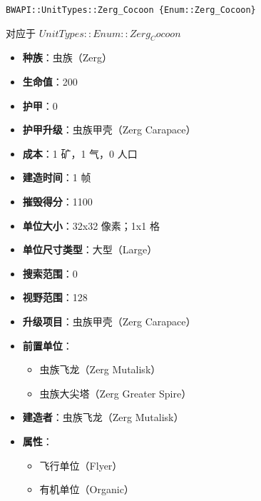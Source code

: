 \begin{tcolorbox}[colback=white, colframe=black!60!white, title=Zerg\_Cocoon(), arc=0mm]
    \begin{verbatim}
BWAPI::UnitTypes::Zerg_Cocoon {Enum::Zerg_Cocoon}
    \end{verbatim}
    对应于  $ UnitTypes::Enum::Zerg_Cocoon $ 
    \begin{itemize}
        \item \textbf{种族}：虫族（Zerg）
        \item \textbf{生命值}：200
        \item \textbf{护甲}：0
        \item \textbf{护甲升级}：虫族甲壳（Zerg Carapace）
        \item \textbf{成本}：1 矿，1 气，0 人口
        \item \textbf{建造时间}：1 帧
        \item \textbf{摧毁得分}：1100
        \item \textbf{单位大小}：32x32 像素；1x1 格
        \item \textbf{单位尺寸类型}：大型（Large）
        \item \textbf{搜索范围}：0
        \item \textbf{视野范围}：128
        \item \textbf{升级项目}：虫族甲壳（Zerg Carapace）
        \item \textbf{前置单位}：
            \begin{itemize}
                \item 虫族飞龙（Zerg Mutalisk）
                \item 虫族大尖塔（Zerg Greater Spire）
            \end{itemize}
        \item \textbf{建造者}：虫族飞龙（Zerg Mutalisk）
        \item \textbf{属性}：
            \begin{itemize}
                \item 飞行单位（Flyer）
                \item 有机单位（Organic）
            \end{itemize}
    \end{itemize}
\end{tcolorbox}

